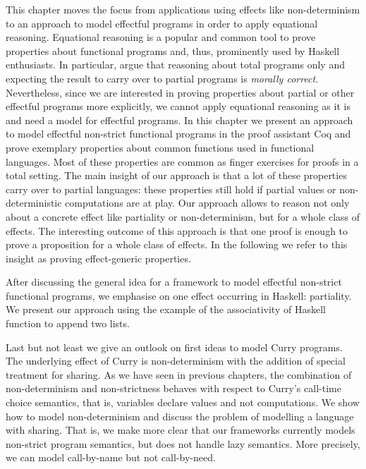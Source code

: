 
This chapter moves the focus from applications using effects like non-determinism to an approach to model effectful programs in order to apply equational reasoning.
Equational reasoning is a popular and common tool to prove properties about functional programs and, thus, prominently used by Haskell enthusiasts. \citep{jeuring2012testing, gibbons2011just, hutton2008reasoning}
In particular, \citet{danielsson2006fast} argue that reasoning about total programs only and expecting the result to carry over to partial programs is \textit{morally correct}.
Nevertheless, since we are interested in proving properties about partial or other effectful programs more explicitly, we cannot apply equational reasoning as it is and need a model for effectful programs.
In this chapter we present an approach to model effectful non-strict functional programs in the proof assistant Coq and prove exemplary properties about common functions used in functional languages.
Most of these properties are common as finger exercises for proofs in a total setting.
The main insight of our approach is that a lot of these properties carry over to partial languages: these properties still hold if partial values or non-deterministic computations are at play.
Our approach allows to reason not only about a concrete effect like partiality or non-determinism, but for a whole class of effects.
The interesting outcome of this approach is that one proof is enough to prove a proposition for a whole class of effects.
In the following we refer to this insight as proving effect-generic properties.

After discussing the general idea for a framework to model effectful non-strict functional programs, we emphasise on one effect occurring in Haskell: partiality.
We present our approach using the example of the associativity of Haskell function to append two lists.

Last but not least we give an outlook on first ideas to model Curry programs.
The underlying effect of Curry is non-determinism with the addition of special treatment for sharing.
As we have seen in previous chapters, the combination of non-determinism and non-strictness behaves with respect to Curry's call-time choice semantics, that is, variables declare values and not computations.
We show how to model non-determinism and discuss the problem of modelling a language with sharing.
That is, we make more clear that our frameworks currently models non-strict program semantics, but does not handle lazy semantics.
More precisely, we can model call-by-name but not call-by-need.

